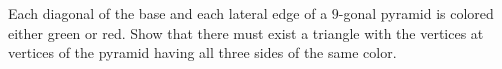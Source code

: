 Each diagonal of the base and each lateral edge of a $9$-gonal pyramid is colored either green or red. Show that there must exist a triangle with the vertices at vertices of the pyramid having all three sides of the same color.